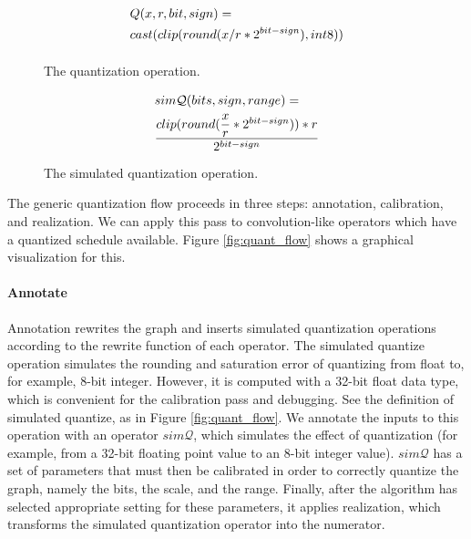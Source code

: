 \begin{figure}[h]
    \begin{equation}
      \begin{aligned}[b]
        \scriptscriptstyle
        & Q(x, r, bit, sign) =\\ & cast(clip(round(x/r*2^{bit-sign}), int8)) \\
      \end{aligned}
    \end{equation}
    \caption{The quantization operation.}
    \label{fig:quant_op}
    \begin{equation}
      \begin{aligned}[b]
        \scriptscriptstyle
        & sim\mathcal{Q}(bits, sign, range) =\\ & \dfrac{clip(round(\dfrac{x}{r} * 2^{bit - sign})) * r}{2^{bit - sign}}
      \end{aligned}
    \end{equation}
    \caption{The simulated quantization operation.}
    \label{fig:sim_quant_op}
\end{figure}

The generic quantization flow proceeds in three steps: annotation, calibration, and realization. We
can apply this pass to convolution-like operators which have a quantized schedule
available. Figure \ref{fig:quant_flow} shows a graphical visualization for this.

\paragraph{Annotate}

Annotation rewrites the graph and inserts simulated quantization operations according to the
rewrite function of  each  operator. The simulated quantize operation simulates the rounding
and saturation error of quantizing from float to, for example, 8-bit integer.
However, it is computed with a 32-bit float data type, which is convenient for the
calibration pass and debugging.
See the definition of simulated quantize, as in Figure \ref{fig:quant_flow}.
We annotate the inputs to this operation with an operator $sim\mathcal{Q}$,
  which simulates the effect of quantization (for example, from a 32-bit
  floating point value to an 8-bit integer value).
$sim\mathcal{Q}$ has a set of parameters that must then be calibrated in order to
correctly quantize the graph, namely the bits, the scale, and the range.
Finally, after the algorithm has selected
appropriate setting for these parameters, it applies realization,
which transforms the simulated quantization operator into the numerator.

